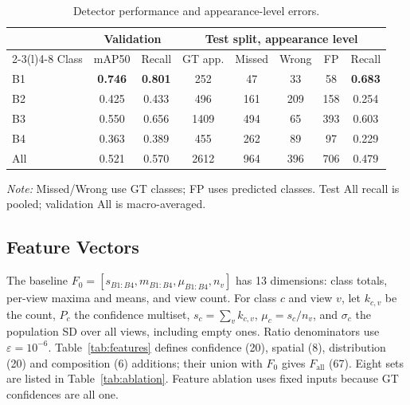 \documentclass[conference,a4paper]{IEEEtran}
\begin{document}
\begin{table}[!tb]
  \centering
  \footnotesize
  \renewcommand{\arraystretch}{1.13}
  \setlength{\tabcolsep}{2.6pt}
  \caption{Detector performance and appearance-level errors.}
  \label{tab:yolo}
  \begin{tabular*}{\columnwidth}{@{\extracolsep{\fill}}lccccccc@{}}
    \toprule
      & \multicolumn{2}{c}{Validation} & \multicolumn{5}{c}{Test split, appearance level} \\
    \cmidrule(lr){2-3}\cmidrule(l){4-8}
    Class & mAP50 & Recall & GT app. & Missed & Wrong & FP & Recall \\
    \midrule
    B1  & \textbf{0.746} & \textbf{0.801} &  252 &  47 &  33 &  58 & \textbf{0.683} \\
    B2  & 0.425          & 0.433          &  496 & 161 & 209 & 158 & 0.254          \\
    B3  & 0.550          & 0.656          & 1409 & 494 &  65 & 393 & 0.603          \\
    B4  & 0.363          & 0.389          &  455 & 262 &  89 &  97 & 0.229          \\
    All & 0.521          & 0.570          & 2612 & 964 & 396 & 706 & 0.479          \\
    \bottomrule
  \end{tabular*}
\par\vspace{3pt}
  \begin{minipage}{\columnwidth}
    \footnotesize\raggedright
    \textit{Note:} Missed/Wrong use GT classes; FP uses predicted classes. Test All recall is pooled; validation All is macro-averaged.
  \end{minipage}
\end{table}

\subsection{Feature Vectors}
The baseline $F_0=[s_{B1:B4},m_{B1:B4},\mu_{B1:B4},n_v]$ has 13 dimensions:
class totals, per-view maxima and means, and view count. For class $c$ and view
$v$, let $k_{c,v}$ be the count, $P_c$ the confidence multiset,
$s_c=\sum_v k_{c,v}$, $\mu_c=s_c/n_v$, and $\sigma_c$ the population SD over
all views, including empty ones. Ratio denominators use $\varepsilon=10^{-6}$.
Table~\ref{tab:features} defines confidence (20), spatial (8), distribution
(20) and composition (6) additions; their union with $F_0$ gives $F_{\text{all}}$
(67). Eight sets are listed in Table~\ref{tab:ablation}. Feature ablation uses
fixed inputs because GT confidences are all one.
\end{document}
